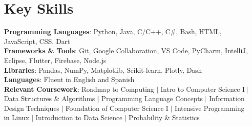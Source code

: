 \documentclass[letterpaper,11pt]{article}
\begin{document}
\section{Key Skills}
\begin{itemize}[leftmargin=0.15in, label={}]
    \small{\item{
      \textbf{Programming Languages}{: Python, Java, C/C++, C\#, Bash, HTML, JavaScript, CSS, Dart} \\
      \textbf{Frameworks \& Tools}{: Git, Google Collaboration, VS Code, PyCharm, IntelliJ, Eclipse, Flutter, Firebase, Node.js} \\
      \textbf{Libraries}{: Pandas, NumPy, Matplotlib, Scikit-learn, Plotly, Dash} \\
      \textbf{Languages}{: Fluent in English and Spanish} \\
      \textbf{Relevant Coursework}{: Roadmap to Computing $|$ Intro to Computer Science I $|$ Data Structures \& Algorithms $|$ Programming Language Concepts $|$ Information Design Techniques $|$ Foundation of Computer Science I $|$ Intensive Programming in Linux $|$ Introduction to Data Science $|$ Probability \& Statistics} \\
    }}
\end{itemize}
\end{document}
